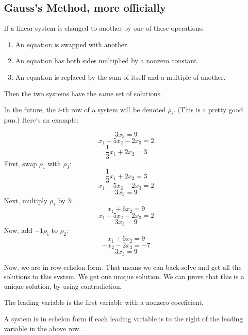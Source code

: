 \documentclass{article}
\begin{document}
\subsection{Gauss's Method, more officially}
\begin{theorem}
    If a linear system is changed to another by one of these operations:
    \begin{enumerate}
        \item An equation is swapped with another.
        \item An equation has both sides multiplied by a nonzero constant.
        \item An equation is replaced by the sum of itself and a multiple of another.
    \end{enumerate}
    Then the two systems have the same set of solutions.
\end{theorem}
In the future, the $i$-th row of a system will be denoted $\rho_i$. (This is a pretty good pun.)
\bigbreak
Here's an example:

    \[3x_3 = 9\]
    \[x_1 + 5x_2 - 2x_3 = 2\]
    \[\frac{1}{3}x_1 + 2x_2 = 3\]
First, swap $\rho_1$ with $\rho_3$:
    \[\frac{1}{3}x_1 + 2x_2 = 3\]
    \[x_1 + 5x_2 - 2x_3 = 2\]
    \[3x_3 = 9\]
Next, multiply $\rho_1$ by $3$:
    \[x_1 + 6x_2 = 9\]
    \[x_1 + 5x_2 - 2x_3 = 2 \]
    \[3x_3 = 9\]
Now, add $-1\rho_1$ to $\rho_2$:
    \[x_1 + 6x_2 = 9\]
    \[-x_2 - 2x_3 = -7\]
    \[3x_3 = 9\]

Now, we are in row-echelon form. That means we can back-solve and get all the solutions to this system. We get one unique solution. We can prove that this is a unique solution, by using contradiction. 

\begin{definition}
The leading variable is the first variable with a nonzero coeeficient.
\end{definition}

\begin{definition}
A system is in echelon form if each leading variable is to the right of the leading variable in the above row. 
\end{definition}


\newpage





\end{document}

